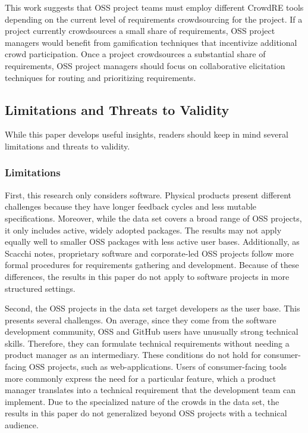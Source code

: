 This work suggests that OSS project teams must employ different CrowdRE tools depending on the current level of requirements crowdsourcing for the project. If a project currently crowdsources a small share of requirements, OSS project managers would benefit from gamification techniques \cite{snijders, snijders2} that incentivize additional crowd participation. Once a project crowdsources a substantial share of requirements, OSS project managers should focus on collaborative elicitation techniques for routing and prioritizing requirements.

\subsection{Limitations and Threats to Validity}
\label{limitations}

While this paper develops useful insights, readers should keep in mind several limitations and threats to validity.

\subsubsection{Limitations}

First, this research only considers software. Physical products present different challenges because they have longer feedback cycles and less mutable specifications. Moreover, while the data set covers a broad range of OSS projects, it only includes active, widely adopted packages. The results may not apply equally well to smaller OSS packages with less active user bases. Additionally, as Scacchi \cite{scacchi} notes, proprietary software and corporate-led OSS projects follow more formal procedures for requirements gathering and development. Because of these differences, the results in this paper do not apply to software projects in more structured settings.

Second, the OSS projects in the data set target developers as the user base. This presents several challenges. On average, since they come from the software development community, OSS and GitHub users have unusually strong technical skills. Therefore, they can formulate technical requirements without needing a product manager as an intermediary. These conditions do not hold for consumer-facing OSS projects, such as web-applications. Users of consumer-facing tools more commonly express the need for a particular feature, which a product manager translates into a technical requirement that the development team can implement. Due to the specialized nature of the crowds in the data set, the results in this paper do not generalized beyond OSS projects with a technical audience.

